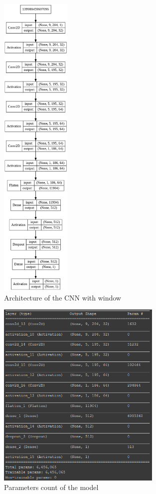 \documentclass[12pt, twoside]{article}
\begin{document}
\begin{figure}
	\centering
	\includegraphics[width=0.3\textwidth]{../images/model_v3.png}
	\caption{Architecture of the CNN with window}
	\label{archiv3}
\end{figure}

\begin{figure}
	\centering
	\includegraphics[width=0.7\textwidth]{../images/model_v3_params.png}
	\caption{Parameters count of the model}
	\label{paramv3}
\end{figure}
\end{document}
